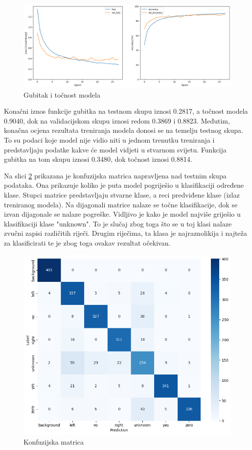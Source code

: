 \begin{figure}[htb]
    \centering
    \includegraphics[width=1\linewidth]{Chapters/neuronska_mreza/trening/acc.png} 
    \caption{Gubitak i točnost modela}
    \label{pic:accuracy}
\end{figure}

Konačni iznos funkcije gubitka na testnom skupu iznosi 0.2817, a točnost modela 0.9040, dok
na validacijskom skupu iznosi redom 0.3869 i 0.8823. Međutim, konačna ocjena rezultata
treniranja modela donosi se na temelju testnog skupa. To su podaci koje model nije vidio
niti u jednom trenutku treniranja i predstavljaju podatke kakve će model vidjeti u stvarnom
svijetu. Funkcija gubitka na tom skupu iznosi 0.3480, dok točnost iznosi 0.8814.

Na slici \ref{pic:confmtrx} prikazana je konfuzijska matrica napravljena nad
testnim skupa podataka. Ona prikazuje koliko je puta model pogriješio u klasifikaciji
određene klase. Stupci matrice predstavljaju stvarne klase, a reci predviđene klase
(izlaz treniranog modela). Na dijagonali matrice nalaze se točne klasifikacije, dok
se izvan dijagonale se nalaze pogreške. Vidljivo je kako je model najviše griješio
u klasifikaciji klase "unknown". To je slučaj zbog toga što se u toj klasi nalaze
zvučni zapisi različitih riječi. Drugim riječima, ta klasa je najraznolikija i najteža
za klasificirati te je zbog toga ovakav rezultat očekivan.

\begin{figure}[htb]
    \centering
    \includegraphics[width=0.7\linewidth]{Chapters/neuronska_mreza/trening/image.png} 
    \caption{Konfuzijska matrica}
    \label{pic:confmtrx}
\end{figure}

